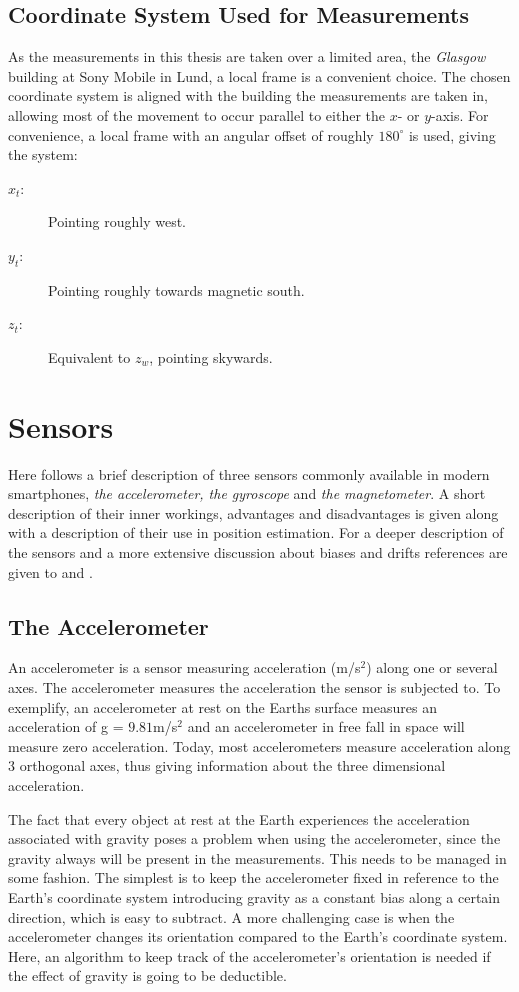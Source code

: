 \documentclass{LTHthesis}
\begin{document}
\subsection{Coordinate System Used for Measurements}
%
As the measurements in this thesis are taken over a limited area, the \emph{Glasgow} building at Sony Mobile in Lund, a local frame is a convenient choice. The chosen coordinate system is aligned with the building the measurements are taken in, allowing most of the movement to occur parallel to either the $x$- or $y$-axis. For convenience, a local frame with an angular offset of roughly $180^\circ$ is used, giving the system:
%
\begin{description}
\item[$x_t$:] Pointing roughly west. 
\item[$y_t$:] Pointing roughly towards magnetic south.
\item[$z_t$:] Equivalent to $z_w$, pointing skywards.
\end{description}
%
%
\section{Sensors}
Here follows a brief description of three sensors commonly available in modern smartphones, \emph{the accelerometer, the gyroscope} and \emph{the magnetometer}. A short description of their inner workings, advantages and disadvantages is given along with a description of their use in position estimation. For a deeper description of the sensors and a more extensive discussion about biases and drifts references are given to \cite{bently88} and \cite{morris96}. 
%
\subsection{The Accelerometer}
%
An accelerometer is a sensor measuring acceleration (m/s$^2$) along one or several axes. The accelerometer measures the acceleration the sensor is subjected to. To exemplify, an accelerometer at rest on the Earths surface measures an acceleration of g = $9.81$m/s$^2$ and an accelerometer in free fall in space will measure zero acceleration. Today, most accelerometers measure acceleration along 3 orthogonal axes, thus giving information about the three dimensional acceleration. 

The fact that every object at rest at the Earth experiences the acceleration associated with gravity poses a problem when using the accelerometer, since the gravity always will be present in the measurements. This needs to be managed in some fashion. The simplest is to keep the accelerometer fixed in reference to the Earth's coordinate system introducing gravity as a constant bias along a certain direction, which is easy to subtract. A more challenging case is when the accelerometer changes its orientation compared to the Earth's coordinate system. Here, an algorithm to keep track of the accelerometer's orientation is needed if the effect of gravity is going to be deductible. 
\end{document}
